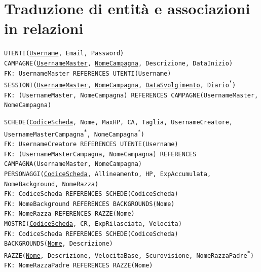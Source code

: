 \documentclass[a4paper,12pt]{report}
\begin{document}
\section{Traduzione di entità e associazioni in relazioni}
\noindent \texttt{UTENTI(\underline{Username}, Email, Password)} \\

\noindent \texttt{CAMPAGNE(\underline{UsernameMaster}, \underline{NomeCampagna}, Descrizione, DataInizio)} \\
\texttt{FK: UsernameMaster REFERENCES UTENTI(Username)} \\

\noindent \texttt{SESSIONI(\underline{UsernameMaster}, \underline{NomeCampagna}, \underline{DataSvolgimento}, Diario\textsuperscript{*})} \\
\texttt{FK: (UsernameMaster, NomeCampagna) REFERENCES CAMPAGNE(UsernameMaster, NomeCampagna)} \\

\newpage

\noindent \texttt{SCHEDE(\underline{CodiceScheda}, Nome, MaxHP, CA, Taglia, UsernameCreatore, UsernameMasterCampagna\textsuperscript{*}, NomeCampagna\textsuperscript{*})} \\
\texttt{FK: UsernameCreatore REFERENCES UTENTE(Username)} \\
\texttt{FK: (UsernameMasterCampagna, NomeCampagna) REFERENCES CAMPAGNA(UsernameMaster, NomeCampagna)} \\

\noindent \texttt{PERSONAGGI(\underline{CodiceScheda}, Allineamento, HP, ExpAccumulata, NomeBackground, NomeRazza)} \\
\texttt{FK: CodiceScheda REFERENCES SCHEDE(CodiceScheda)} \\
\texttt{FK: NomeBackground REFERENCES BACKGROUNDS(Nome)} \\
\texttt{FK: NomeRazza REFERENCES RAZZE(Nome)} \\

\noindent \texttt{MOSTRI(\underline{CodiceScheda}, CR, ExpRilasciata, Velocita)} \\
\texttt{FK: CodiceScheda REFERENCES SCHEDE(CodiceScheda)} \\

\noindent \texttt{BACKGROUNDS(\underline{Nome}, Descrizione)} \\

\noindent \texttt{RAZZE(\underline{Nome}, Descrizione, VelocitaBase, Scurovisione, NomeRazzaPadre\textsuperscript{*})} \\
\texttt{FK: NomeRazzaPadre REFERENCES RAZZE(Nome)} \\
\end{document}
